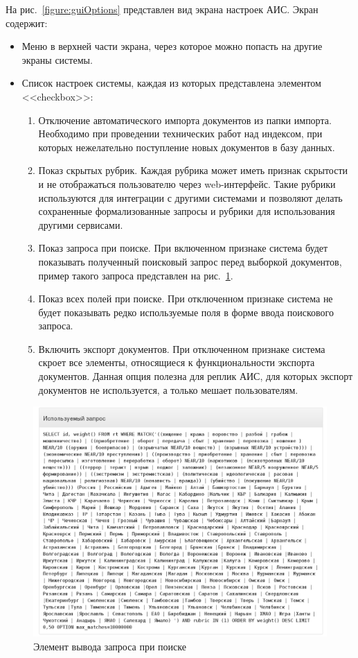 На рис.~\ref{figure:guiOptions} представлен вид экрана настроек АИС. Экран содержит:
\begin{itemize}
\item Меню в верхней части экрана, через которое можно попасть на другие экраны системы.
\item Список настроек системы, каждая из которых представлена элементом <<checkbox>>:
\begin{enumerate}
  \item Отключение автоматического импорта документов из папки импорта. Необходимо при проведении технических работ над индексом, при которых нежелательно поступление новых документов в базу данных.
  \item Показ скрытых рубрик. Каждая рубрика может иметь признак скрытости и не отображаться пользователю через web-интерфейс. Такие рубрики используются для интеграции с другими системами и позволяют делать сохраненные формализованные запросы  и рубрики для использования другими сервисами.
  \item Показ запроса при поиске. При включенном признаке система будет показывать полученный поисковый запрос перед выборкой документов, пример такого запроса представлен на рис.~\ref{figure:guiOptionsQuery}.
  \item Показ всех полей при поиске. При отключенном признаке система не будет показывать редко используемые поля в форме ввода поискового запроса.
  \item Включить экспорт документов. При отключенном признаке система скроет все элементы, относящиеся к функциональности экспорта документов. Данная опция полезна для реплик АИС, для которых экспорт документов не используется, а только мешает пользователям.
\end{enumerate}
\end{itemize}

\begin{figure}[h!]
\centering
\includegraphics[width=0.9\linewidth]{technology/gui_options_query}
\caption{Элемент вывода запроса при поиске}
\label{figure:guiOptionsQuery}
\end{figure}


